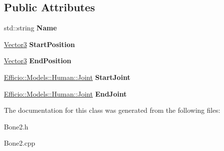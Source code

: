 \subsection*{Public Attributes}
\begin{DoxyCompactItemize}
\item 
std\+::string {\bfseries Name}\hypertarget{class_efficio_1_1_models_1_1_human_1_1_bone2_abdccdc8ff566790ebdadb1e100a4f69d}{}\label{class_efficio_1_1_models_1_1_human_1_1_bone2_abdccdc8ff566790ebdadb1e100a4f69d}

\item 
\hyperlink{class_efficio_1_1_vector3}{Vector3} {\bfseries Start\+Position}\hypertarget{class_efficio_1_1_models_1_1_human_1_1_bone2_a4f3e0efa0d0f5a8180bc3a792db2fbad}{}\label{class_efficio_1_1_models_1_1_human_1_1_bone2_a4f3e0efa0d0f5a8180bc3a792db2fbad}

\item 
\hyperlink{class_efficio_1_1_vector3}{Vector3} {\bfseries End\+Position}\hypertarget{class_efficio_1_1_models_1_1_human_1_1_bone2_aa309d741cce254b4476e2935b28abcd4}{}\label{class_efficio_1_1_models_1_1_human_1_1_bone2_aa309d741cce254b4476e2935b28abcd4}

\item 
\hyperlink{class_efficio_1_1_models_1_1_human_1_1_joint}{Efficio\+::\+Models\+::\+Human\+::\+Joint} {\bfseries Start\+Joint}\hypertarget{class_efficio_1_1_models_1_1_human_1_1_bone2_a84d54768f35aed1ce271891d5c3bf94f}{}\label{class_efficio_1_1_models_1_1_human_1_1_bone2_a84d54768f35aed1ce271891d5c3bf94f}

\item 
\hyperlink{class_efficio_1_1_models_1_1_human_1_1_joint}{Efficio\+::\+Models\+::\+Human\+::\+Joint} {\bfseries End\+Joint}\hypertarget{class_efficio_1_1_models_1_1_human_1_1_bone2_a960225768ffb5dede580716c3b39840f}{}\label{class_efficio_1_1_models_1_1_human_1_1_bone2_a960225768ffb5dede580716c3b39840f}

\end{DoxyCompactItemize}


The documentation for this class was generated from the following files\+:\begin{DoxyCompactItemize}
\item 
Bone2.\+h\item 
Bone2.\+cpp\end{DoxyCompactItemize}
